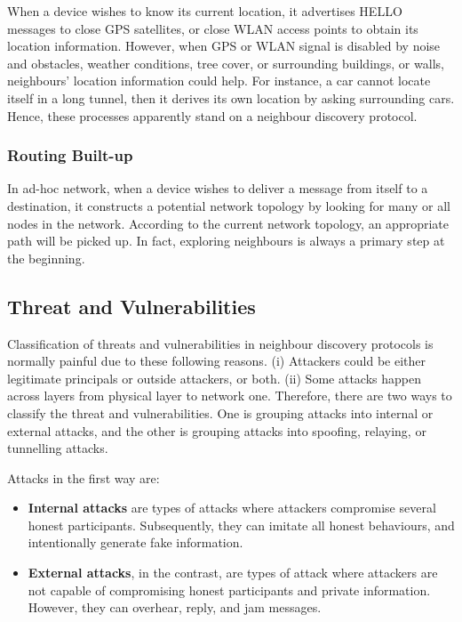 When a device wishes to know its current location, it advertises HELLO messages to close GPS satellites, or close WLAN access points to obtain its location information. However, when GPS or WLAN signal is disabled by noise and obstacles, weather conditions, tree cover, or surrounding buildings, or walls, neighbours' location information could help. For instance, a car cannot locate itself in a long tunnel, then it derives its own location by asking surrounding cars. Hence, these processes apparently stand on a neighbour discovery protocol.

\subsubsection*{Routing Built-up}

In ad-hoc network, when a device wishes to deliver a message from itself to a destination, it constructs a potential network topology by looking for many or all nodes in the network. According to the current network topology, an appropriate path will be picked up. In fact, exploring neighbours is always a primary step at the beginning. 

\subsection{Threat and Vulnerabilities}\label{threatndp}

Classification of threats and vulnerabilities in neighbour discovery protocols is normally painful due to these following reasons. (i) Attackers could be either legitimate principals or outside attackers, or both. (ii) Some attacks happen across layers from physical layer to network one. Therefore, there are two ways to classify the threat and vulnerabilities. One is grouping attacks into internal or external attacks, and the other is grouping attacks into spoofing, relaying, or tunnelling attacks. 

Attacks in the first way are:
\begin{itemize}
\item \textbf{Internal attacks} are types of attacks where attackers compromise several honest participants. Subsequently, they can imitate all honest behaviours, and intentionally generate fake information. 
\item \textbf{External attacks}, in the contrast, are types of attack where attackers are not capable of compromising honest participants and private information. However, they can overhear, reply, and jam messages. 
\end{itemize}

